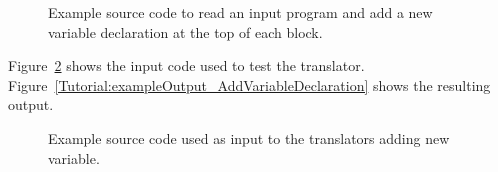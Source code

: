 \begin{itemize}


\begin{figure}[!hbp]
{\indent
{\mySmallFontSize
\begin{latexonly}
   
\end{latexonly}

\begin{htmlonly}
   
\end{htmlonly}

}
}
\caption{Example source code to read an input program and add a new variable 
         declaration at the top of each block.}
\label{Tutorial:exampleAddVariableDeclaration}
\end{figure}
\end{itemize}


Figure~\ref{Tutorial:exampleInputCode_AddVariableDeclaration} shows the
input code used to test the translator. 
Figure~\ref{Tutorial:exampleOutput_AddVariableDeclaration} shows the resulting output.

\begin{figure}[!h]
{\indent
{\mySmallFontSize


\begin{latexonly}
   
\end{latexonly}

\begin{htmlonly}
   
\end{htmlonly}

}
}
\caption{Example source code used as input to the translators adding new variable.}
\label{Tutorial:exampleInputCode_AddVariableDeclaration}
\end{figure}

